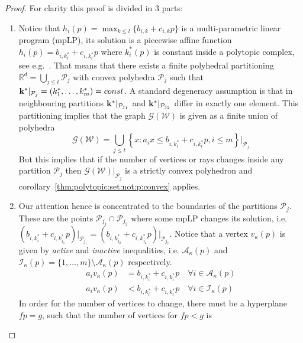 \documentclass[journal]{IEEEtran}
\theoremstyle{remark}
\theoremstyle{definition}
\begin{document}
\begin{proof}
For clarity this proof is divided in 3 parts:
\begin{enumerate}
\item Notice that $h_i(p) = \max_{k\leq l} \{b_{i,k} + c_{i,k}p\}$ is a multi-parametric linear program (mpLP),
its solution is a piecewise affine function $h_i(p) = b_{i,k^\ast_i} + c_{i,k^\ast_i}p$ where $k^\ast_i(p)$ is constant
inside a polytopic complex, see e.g.~\cite{spjotvold:2005}.
%
That means that there exists a finite polyhedral partitioning $\mathbb R^d = \bigcup_{j\leq t} \mathcal P_j$ with convex polyhedra 
$\mathcal P_j$ such that ${\bf{k}}^\ast\vert_{\mathcal P_j} = (k_1^\ast,\dots,k_m^\ast) = const$.
%
A standard degeneracy assumption is that in neighbouring partitions ${\bf{k}}^\ast\vert_{\mathcal P_{j_1}}$ and 
${\bf{k}}^\ast\vert_{\mathcal P_{j_2}}$ differ in exactly one element.
%
This partitioning implies that the graph $\mathscr G(\mathcal W)$ is given as a finite union of polyhedra
%
\begin{equation*}
  \mathscr G(\mathcal W) = \bigcup_{j\leq t} \left\{x: a_i x \leq b_{i,k_i^\ast} + c_{i,k_i^\ast}p,i\leq m
  \right\}\bigr\vert_{\mathcal P_{j}}
\end{equation*}
%
But this implies that if the number of vertices or rays changes inside any partition $\mathcal P_j$ then $\mathscr
G(\mathcal W)\vert_{\mathcal P_j}$ is a strictly convex polyhedron and corollary~\ref{thm:polytopic:set:not:p:convex} applies.
%
\item Our attention hence is concentrated to the boundaries of the partitions $\mathcal P_j$.
%
These are the points $\mathcal P_{j_1} \cap \mathcal P_{j_2}$ where some mpLP changes its solution, i.e. 
$\left(b_{i,k_i^\ast} + c_{i,k_{j_1}^\ast} p\right)\big\vert_{\mathcal P_{j_1}} = 
\left(b_{i,k_{j_2}^\ast} + c_{i,k_{j_2}^\ast} p\right)\big\vert_{\mathcal P_{j_2}}$.
%
Notice that a vertex $v_\kappa(p)$ is given by \emph{active} and \emph{inactive} inequalities, i.e. $\mathcal A_\kappa(p)$ and
$\mathcal I_\kappa(p) = \{1,\dots,m\}\setminus\mathcal A_\kappa(p)$ respectively.
%
\begin{equation*}\begin{split}
  a_i v_\kappa(p) &= b_{i,k_i^\ast} + c_{i,k_i^\ast} p \quad\forall i\in\mathcal A_\kappa(p)\\
  a_i v_\kappa(p) &< b_{i,k_i^\ast} + c_{i,k_i^\ast} p \quad\forall i\in\mathcal I_\kappa(p)
\end{split}\end{equation*}
%
In order for the number of vertices to change, there must be a hyperplane $fp=g$, such that the number of vertices for $fp<g$ is 

\end{enumerate}
\end{proof}
\end{document}
